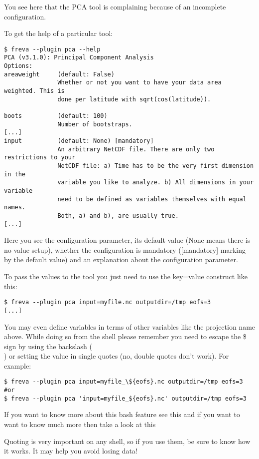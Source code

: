 \documentclass[a4paper,11pt]{ltxdoc}
\begin{document}
You see here that the PCA tool is complaining because of an incomplete configuration.

To get the help of a particular tool:
\begin{verbatim}
$ freva --plugin pca --help
PCA (v3.1.0): Principal Component Analysis
Options:
areaweight     (default: False)
               Whether or not you want to have your data area weighted. This is
               done per latitude with sqrt(cos(latitude)).

boots          (default: 100)
               Number of bootstraps.
[...]
input          (default: None) [mandatory]
               An arbitrary NetCDF file. There are only two restrictions to your
               NetCDF file: a) Time has to be the very first dimension in the
               variable you like to analyze. b) All dimensions in your variable
               need to be defined as variables themselves with equal names.
               Both, a) and b), are usually true.
[...]
\end{verbatim}

Here you see the configuration parameter, its default value (None means there is no value setup), whether the configuration is mandatory ([mandatory] marking by the default value) and an explanation about the configuration parameter.

To pass the values to the tool you just need to use the key=value construct like this:
\begin{verbatim}
$ freva --plugin pca input=myfile.nc outputdir=/tmp eofs=3
[...]
\end{verbatim}

You may even define variables in terms of other variables like the projection name above. While doing so from the shell please remember you need to escape the \$ sign by using the backslash (\\) or setting the value in single quotes (no, double quotes don't work). For example:
\begin{verbatim}
$ freva --plugin pca input=myfile_\${eofs}.nc outputdir=/tmp eofs=3
#or
$ freva --plugin pca 'input=myfile_${eofs}.nc' outputdir=/tmp eofs=3
\end{verbatim}

If you want to know more about this bash feature see this and if you want to want to know much more then take a look at this

Quoting is very important on any shell, so if you use them, be sure to know how it works. It may help you avoid losing data!
\end{document}
